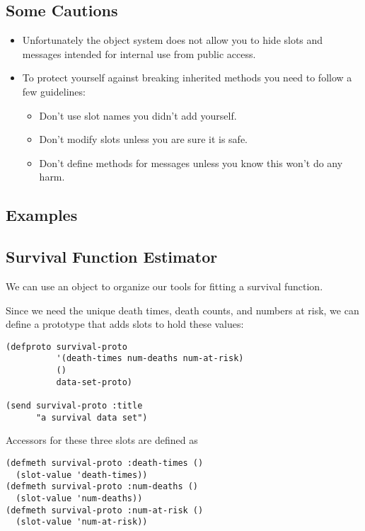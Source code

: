 \begin{slide}{}
\subsection{Some Cautions}
\begin{itemize}
\item
Unfortunately the object system does not allow you to hide slots and
messages intended for internal use from public access.
\item
To protect yourself against breaking inherited methods you need to
follow a few guidelines:
\begin{itemize}
\item
Don't use slot names you didn't add yourself.
\item
Don't modify slots unless you are sure it is safe.
\item
Don't define methods for messages unless you know this won't do any
harm.
\end{itemize}
\end{itemize}
\end{slide}

\begin{slide}{}
\section{Examples}
\subsection{Survival Function Estimator}
We can use an object to organize our tools for fitting a survival function.

Since we need the unique death times, death counts, and numbers at risk,
we can define a prototype that adds slots to hold these values:
{\Large
\begin{verbatim}
(defproto survival-proto
          '(death-times num-deaths num-at-risk)
          ()
          data-set-proto)

(send survival-proto :title
      "a survival data set")
\end{verbatim}}
Accessors for these three slots are defined as
{\Large
\begin{verbatim}
(defmeth survival-proto :death-times ()
  (slot-value 'death-times))
(defmeth survival-proto :num-deaths ()
  (slot-value 'num-deaths))
(defmeth survival-proto :num-at-risk ()
  (slot-value 'num-at-risk))
\end{verbatim}}
\end{slide}

